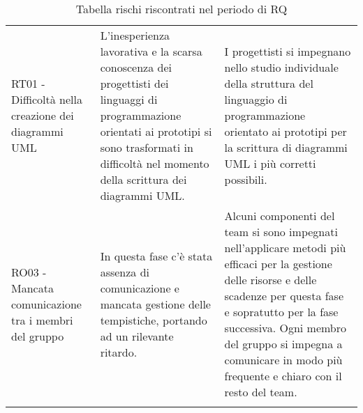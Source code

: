 \documentclass[../piano_di_progetto.tex]{subfiles}
\begin{document}
\begin{center}
\begin{longtable}{|p{4cm}|p{6cm}|p{6cm}|}
		RT01 - Difficoltà nella creazione dei diagrammi UML
		& L'inesperienza lavorativa e la scarsa conoscenza dei progettisti dei linguaggi di programmazione orientati ai prototipi si sono trasformati in difficoltà nel momento della scrittura dei diagrammi UML. 
		& I progettisti si impegnano nello studio individuale della struttura del linguaggio di programmazione orientato ai prototipi per la scrittura di diagrammi UML i più corretti possibili. \\

		RO03 - Mancata comunicazione tra i membri del gruppo
		& In questa fase c'è stata assenza di comunicazione e mancata gestione delle tempistiche, portando ad un rilevante ritardo.
		& Alcuni componenti del team si sono impegnati nell'applicare metodi più efficaci per la gestione delle risorse e delle scadenze per questa fase e sopratutto per la fase successiva. Ogni membro del gruppo si impegna a comunicare in modo più frequente e chiaro con il resto del team. \\
		\hline
		\rowcolor{white}
		\caption{Tabella rischi riscontrati nel periodo di RQ}
	\end{longtable}

\end{center}
\end{document}
